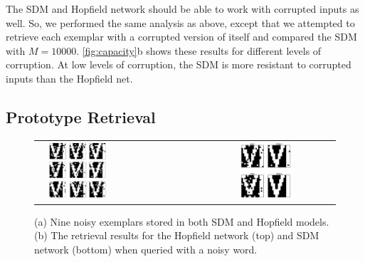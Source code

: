 \documentclass[10pt,letterpaper]{article}
\begin{document}
The SDM and Hopfield network should be able to work with corrupted
inputs as well. So, we performed the same analysis as above, except
that we attempted to retrieve each exemplar with a corrupted version
of itself and compared the SDM with $M=10000$.  \ref{fig:capacity}b
shows these results for different levels of corruption. At low levels
of corruption, the SDM is more resistant to corrupted inputs than the
Hopfield net. 

\subsection{Prototype Retrieval}


\begin{figure}[t!]
  \begin{center}
    \begin{tabular}{ l l l c}
      \raisebox{2.5in}{(a)} &
      \includegraphics[width=0.43\textwidth]{./figures/exemplars.png} &
      \raisebox{2.5in}{(b)} &
      \includegraphics[width=0.4\textwidth]{./figures/prototypeResults.png} \\
    \end{tabular}
    \caption{(a) Nine noisy exemplars stored in both SDM and Hopfield
      models. (b) The retrieval results for the Hopfield network (top)
      and SDM network (bottom) when queried with a noisy word.}
    \label{fig:prototypes}
  \end{center}
\end{figure}
\end{document}
